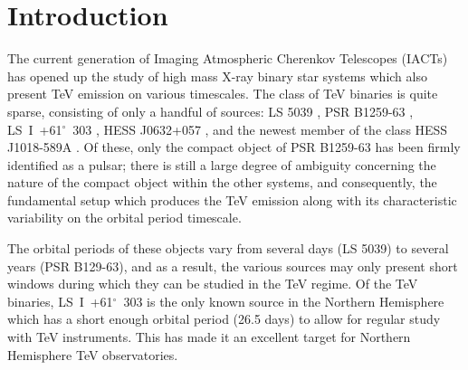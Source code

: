 \documentclass[preprint2]{aastex}
\newcommand{\lsi}{LS~I~+61$^{\circ}$~303}
\begin{document}
\keywords{}

\section{Introduction}

The current generation of Imaging Atmospheric Cherenkov Telescopes (IACTs) has opened up the study of high mass X-ray binary star systems which also present TeV emission on various timescales. The class of TeV binaries is quite sparse, consisting of only a handful of sources: LS 5039 \citep{2005Sci...309..746A}, PSR B1259-63 \citep{2005A&A...442....1A}, \lsi{} \citep{Albert2006}, HESS J0632+057 \citep{2009ApJ...698L..94A}, and the newest member of the class HESS J1018-589A \citep{2015arXiv150302711H}. Of these, only the compact object of PSR B1259-63 has been firmly identified as a pulsar; there is still a large degree of ambiguity concerning the nature of the compact object within the other systems, and consequently, the fundamental setup which produces the TeV emission along with its characteristic variability on the orbital period timescale.



The orbital periods of these objects vary from several days (LS 5039) to several years (PSR B129-63), and as a result, the various sources may only present short windows during which they can be studied in the TeV regime. Of the TeV binaries, \lsi{} is the only known source in the Northern Hemisphere which has a short enough orbital period (26.5 days) to allow for regular study with TeV instruments. This has made it an excellent target for Northern Hemisphere TeV observatories. 
\end{document}
